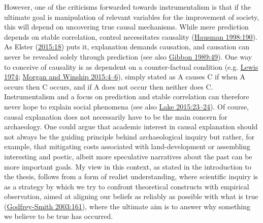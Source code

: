 \documentclass[
  12pt,
  a4paper,
  oneside]{book}
\begin{document}
However, one of the criticisms forwarded towards instrumentalism is that if the ultimate goal is manipulation of relevant variables for the improvement of society, this will depend on uncovering true causal mechanisms. While mere prediction depends on stable correlation, control necessitates causality (\protect\hyperlink{ref-hausman1998}{Hausman 1998:190}). As Elster (\protect\hyperlink{ref-elster2015}{2015:18}) puts it, explanation demands causation, and causation can never be revealed solely through prediction (see also \protect\hyperlink{ref-gibbon1989}{Gibbon 1989:49}). One way to conceive of causality is as dependent on a counter-factual condition (e.g. \protect\hyperlink{ref-lewis1974}{Lewis 1974}; \protect\hyperlink{ref-morgan2015}{Morgan and Winship 2015:4--6}), simply stated as A causes C if when A occurs then C occurs, and if A does not occur then neither does C. Instrumentalism and a focus on prediction and stable correlation can therefore never hope to explain social phenomena (see also \protect\hyperlink{ref-lake2015}{Lake 2015:23--24}). Of course, causal explanation does not necessarily have to be the main concern for archaeology. One could argue that academic interest in causal explanation should not always be the guiding principle behind archaeological inquiry but rather, for example, that mitigating costs associated with land-development or assembling interesting and poetic, albeit more speculative narratives about the past can be more important goals. My view in this context, as stated in the introduction to the thesis, follows from a form of realist understanding, where scientific inquiry is as a strategy by which we try to confront theoretical constructs with empirical observation, aimed at aligning our beliefs as reliably as possible with what is true (\protect\hyperlink{ref-godfrey-smith2003}{Godfrey-Smith 2003:161}), where the ultimate aim is to answer why something we believe to be true has occurred.
\end{document}
